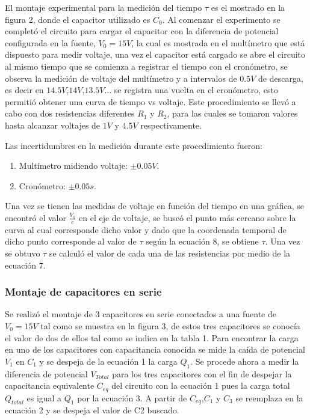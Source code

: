 \documentclass[10pt,letter]{article}
\begin{document}
\begin{multicols}{2}
El montaje experimental para la medición del tiempo $\tau$ es el mostrado en la figura 2, donde el capacitor utilizado es $C_0$. Al comenzar el experimento se completó el circuito para cargar el capacitor con la diferencia de potencial configurada en la fuente, $V_0=15V$, la cual es mostrada en el multímetro que está dispuesto para medir voltaje, una vez el capacitor está cargado se abre el circuito al mismo tiempo que se comienza a registrar el tiempo con el cronómetro, se observa la medición de voltaje del multímetro  y a intervalos de $0.5V$ de descarga, es decir en $14.5V$,$14V$,$13.5V \dots$ se registra una vuelta en el cronómetro, esto permitió obtener una curva de tiempo vs voltaje. Este procedimiento se llevó a cabo con dos resistencias diferentes $R_1$ y $R_2$, para las cuales se tomaron valores hasta alcanzar voltajes de $1V$ y $4.5V$ respectivamente.

\bigskip

Las incertidumbres en la medición durante este procedimiento fueron:
\begin{enumerate}
\itemsep=0em
\item Multímetro midiendo voltaje: $\pm 0.05V$.
\item Cronómetro: $\pm 0.05s$.
\end{enumerate}

Una vez se tienen las medidas de voltaje en función del tiempo en una gráfica, se encontró el valor $\frac{V_0}{e}$ en el eje de voltaje, se buscó el punto más cercano sobre la curva al cual corresponde dicho valor y dado que la coordenada temporal de dicho punto corresponde al valor de $\tau$ según la ecuación 8, se obtiene $\tau$. Una vez se obtuvo $\tau$ se calculó el valor de cada una de las resistencias por medio de la ecuación 7.


\subsubsection{Montaje de capacitores en serie}

Se realizó el montaje de 3 capacitores en serie conectados a una fuente de $V_0=15V$ tal como se muestra en la figura 3, de estos tres capacitores se conocía el valor de dos de ellos tal como se indica en la tabla 1. Para encontrar la carga en uno de los capacitores con capacitancia conocida se mide la caída de potencial $V_1$ en $C_1$ y se despeja de la ecuación 1 la carga $Q_1$. Se procede ahora a medir la  diferencia de potencial $V_{Total}$ para los tres capacitores con el fin de despejar la capacitancia equivalente $C_{eq}$ del circuito con la ecuación 1 pues la carga total $Q_{total}$ es igual a $Q_1$ por la ecuación 3. A partir de $C_{eq}$,$C_1$ y $C_3$ se reemplaza en la ecuación 2 y se despeja el valor de C2 buscado.



\end{multicols}
\end{document}
